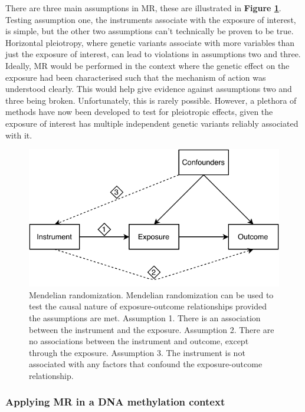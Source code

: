 \documentclass[11pt,twoside]{bristolthesis}
\begin{document}
There are three main assumptions in MR, these are illustrated in \textbf{Figure \ref{fig:mr-diagram}}. Testing assumption one, the instruments associate with the exposure of interest, is simple, but the other two assumptions can't technically be proven to be true. Horizontal pleiotropy, where genetic variants associate with more variables than just the exposure of interest, can lead to violations in assumptions two and three. Ideally, MR would be performed in the context where the genetic effect on the exposure had been characterised such that the mechanism of action was understood clearly. This would help give evidence against assumptions two and three being broken. Unfortunately, this is rarely possible. However, a plethora of methods have now been developed to test for pleiotropic effects, given the exposure of interest has multiple independent genetic variants reliably associated with it.


\begin{figure}
\centering
\includegraphics{figure/01-introduction/mr-diagram.pdf}
\caption{\label{fig:mr-diagram}Mendelian randomization. Mendelian randomization can be used to test the causal nature of exposure-outcome relationships provided the assumptions are met. Assumption 1. There is an association between the instrument and the exposure. Assumption 2. There are no associations between the instrument and outcome, except through the exposure. Assumption 3. The instrument is not associated with any factors that confound the exposure-outcome relationship.}
\end{figure}
\hypertarget{applying-mr-in-a-dna-methylation-context}{%
\subsubsection{Applying MR in a DNA methylation context}\label{applying-mr-in-a-dna-methylation-context}}
\end{document}
